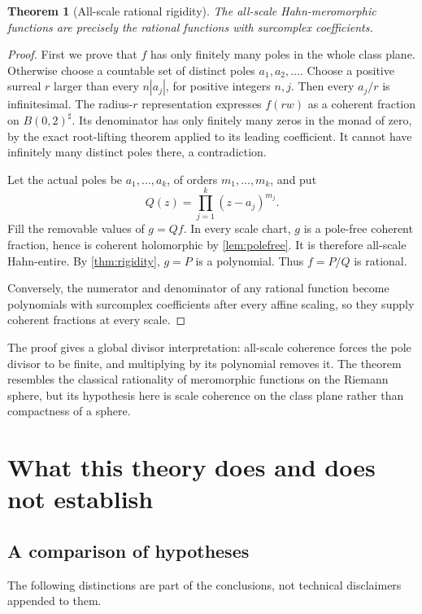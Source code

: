 \documentclass[11pt,letterpaper]{article}
\newtheorem{theorem}{Theorem}[section]
\theoremstyle{definition}
\theoremstyle{remark}
\newcommand{\sh}{^{\sharp}}
\numberwithin{equation}{section}
\begin{document}
\begin{theorem}[All-scale rational rigidity]\label{thm:rationalrigidity}
The all-scale Hahn-meromorphic functions are precisely the rational functions with surcomplex coefficients.
\end{theorem}
\begin{proof}
First we prove that $f$ has only finitely many poles in the whole class plane. Otherwise choose a countable set of distinct poles $a_1,a_2,\ldots$. Choose a positive surreal $r$ larger than every $n|a_j|$, for positive integers $n,j$. Then every $a_j/r$ is infinitesimal. The radius-$r$ representation expresses $f(rw)$ as a coherent fraction on $B(0,2)\sh$. Its denominator has only finitely many zeros in the monad of zero, by the exact root-lifting theorem applied to its leading coefficient. It cannot have infinitely many distinct poles there, a contradiction.

Let the actual poles be $a_1,\ldots,a_k$, of orders $m_1,\ldots,m_k$, and put
\[
 Q(z)=\prod_{j=1}^k(z-a_j)^{m_j}.
\]
Fill the removable values of $g=Qf$. In every scale chart, $g$ is a pole-free coherent fraction, hence is coherent holomorphic by \cref{lem:polefree}. It is therefore all-scale Hahn-entire. By \cref{thm:rigidity}, $g=P$ is a polynomial. Thus $f=P/Q$ is rational.

Conversely, the numerator and denominator of any rational function become polynomials with surcomplex coefficients after every affine scaling, so they supply coherent fractions at every scale.
\end{proof}
The proof gives a global divisor interpretation: all-scale coherence forces the pole divisor to be finite, and multiplying by its polynomial removes it. The theorem resembles the classical rationality of meromorphic functions on the Riemann sphere, but its hypothesis here is scale coherence on the class plane rather than compactness of a sphere.

\section{What this theory does and does not establish}\label{sec:limits}
\subsection{A comparison of hypotheses}
The following distinctions are part of the conclusions, not technical disclaimers appended to them.
\end{document}
